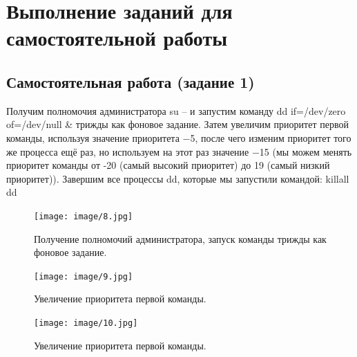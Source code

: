 \documentclass[
  english,
  russian,
  12pt,
  a4paper,
  DIV=11,
  numbers=noendperiod]{scrreprt}
\begin{document}
\chapter{Выполнение заданий для самостоятельной
работы}\label{ux432ux44bux43fux43eux43bux43dux435ux43dux438ux435-ux437ux430ux434ux430ux43dux438ux439-ux434ux43bux44f-ux441ux430ux43cux43eux441ux442ux43eux44fux442ux435ux43bux44cux43dux43eux439-ux440ux430ux431ux43eux442ux44b}

\section{Самостоятельная работа (задание
1)}\label{ux441ux430ux43cux43eux441ux442ux43eux44fux442ux435ux43bux44cux43dux430ux44f-ux440ux430ux431ux43eux442ux430-ux437ux430ux434ux430ux43dux438ux435-1}

Получим полномочия администратора su -- и запустим команду dd
if=/dev/zero of=/dev/null \& трижды как фоновое задание. Затем увеличим
приоритет первой команды, используя значение приоритета −5, после чего
изменим приоритет того же процесса ещё раз, но используем на этот раз
значение −15 (мы можем менять приоритет команды от -20 (самый высокий
приоритет) до 19 (самый низкий приоритет)). Завершим все процессы dd,
которые мы запустили командой: killall dd

\begin{figure}

{\centering \texttt{[image: image/8.jpg]}

}

\caption{Получение полномочий администратора, запуск команды трижды как
фоновое задание.}

\end{figure}%

\begin{figure}

{\centering \texttt{[image: image/9.jpg]}

}

\caption{Увеличение приоритета первой команды.}

\end{figure}%

\begin{figure}

{\centering \texttt{[image: image/10.jpg]}

}

\caption{Увеличение приоритета первой команды.}

\end{figure}%
\end{document}
